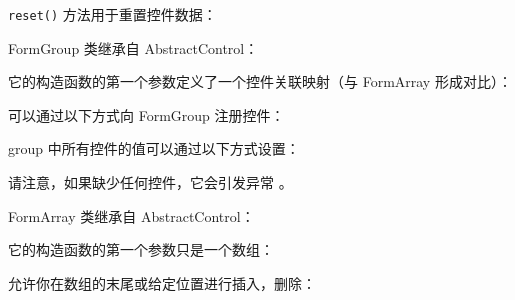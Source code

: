 


\texttt{reset()} 方法用于重置控件数据：




FormGroup 类继承自 AbstractControl：




它的构造函数的第一个参数定义了一个控件关联映射（与 FormArray 形成对比）：




可以通过以下方式向 FormGroup 注册控件：




group 中所有控件的值可以通过以下方式设置：




请注意，如果缺少任何控件，它会引发异常 。


FormArray 类继承自 AbstractControl：




它的构造函数的第一个参数只是一个数组：




允许你在数组的末尾或给定位置进行插入，删除：


